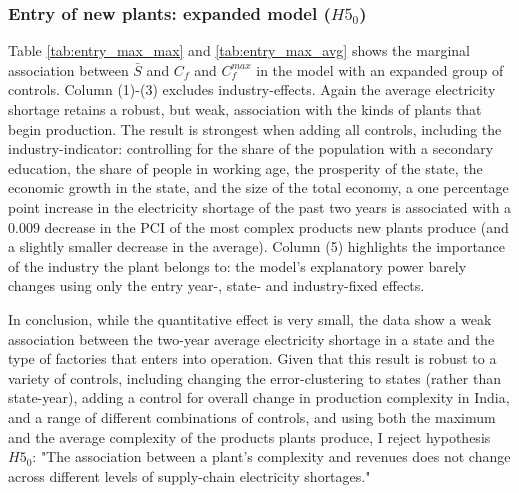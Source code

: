 \documentclass[11pt]{article}
\begin{document}
\subsubsection{Entry of new plants: expanded model ($H5_0$)}
 Table \ref{tab:entry_max_max} and \ref{tab:entry_max_avg} shows the marginal association between $\bar{S}$ and $C_f$ and $C^{max}_f$ in the model with an expanded group of controls. Column (1)-(3) excludes industry-effects. Again the average electricity shortage retains a robust, but weak, association with the kinds of plants that begin production. The result is strongest when adding all controls, including the industry-indicator: controlling for the share of the population with a secondary education, the share of people in working age, the prosperity of the state, the economic growth in the state, and the size of the total economy, a one percentage point increase in the electricity shortage of the past two years is associated with a 0.009 decrease in the PCI of the most complex products new plants produce (and a slightly smaller decrease in the average). Column (5) highlights the importance of the industry the plant belongs to: the model's explanatory power barely changes using only the entry year-, state- and industry-fixed effects.

In conclusion, while the quantitative effect is very small, the data show a weak association between the two-year average electricity shortage in a state and the type of factories that enters into operation. Given that this result is robust to a variety of controls, including changing the error-clustering to states (rather than state-year), adding a control for overall change in production complexity in India, and a range of different combinations of controls, and using both the maximum and the average complexity of the products plants produce, I reject hypothesis $H5_0$: "The association between a plant's complexity and revenues does not change across different levels of supply-chain electricity shortages."
\end{document}
